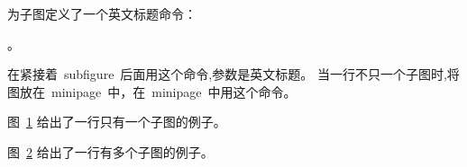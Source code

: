 为子图定义了一个英文标题命令：
\begin{verb}
。
\end{verb}
在紧接着~subfigure~后面用这个命令,参数是英文标题。
当一行不只一个子图时,将图放在~minipage~中，在~minipage~中用这个命令。

图~\ref{Figure:Tricks:Example2} 给出了一行只有一个子图的例子。

图~\ref{Figure:Tricks:Example3} 给出了一行有多个子图的例子。
\begin{figure}[htbp]
\centering
{}
\label{Figure:Tricks:Example2}
\end{figure}

\begin{figure}[htbp]
\centering
\begin{minipage}{0.25\textwidth}
\centering
{}\vspace*{-5pt}
\end{minipage}
\begin{minipage}{0.25\textwidth}
\centering
{}\vspace*{-5pt}
\end{minipage}
\begin{minipage}{0.25\textwidth}
\centering
{}\vspace*{-5pt}
\end{minipage}
\label{Figure:Tricks:Example3}
\end{figure}

